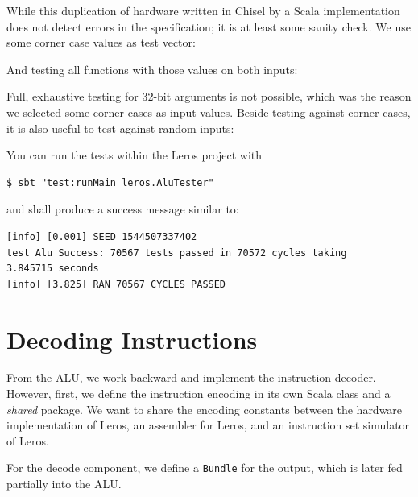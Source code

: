 \documentclass[%
    10pt,
    headinclude, footexclude,
    openright, %
    notitlepage,
    cleardoubleempty,
    headsepline,
    pointlessnumbers,
    bibtotoc, idxtotoc,
    ]{scrbook}
\newcommand{\code}[1]{{\small{\texttt{#1}}}}
\newcommand{\todo}[1]{{\emph{TODO: #1}}}
\renewcommand{\todo}[1]{}
\begin{document}

\noindent While this duplication of hardware written in Chisel by a Scala implementation does not
detect errors in the specification; it is at least some sanity check.
We use some corner case values as test vector:


\noindent And testing all functions with those values on both inputs:


\noindent Full, exhaustive testing for 32-bit arguments is not possible, which was the reason we
selected some corner cases as input values. Beside testing against corner cases, it is also useful
to test against random inputs:


\noindent You can run the tests within the Leros project with

\begin{verbatim}
$ sbt "test:runMain leros.AluTester"
\end{verbatim}

and shall produce a success message similar to:

\begin{verbatim}
[info] [0.001] SEED 1544507337402
test Alu Success: 70567 tests passed in 70572 cycles taking
3.845715 seconds
[info] [3.825] RAN 70567 CYCLES PASSED
\end{verbatim}

\section{Decoding Instructions}

From the ALU, we work backward and implement the instruction decoder.
However, first, we define the instruction encoding in its own Scala class and
a \emph{shared} package. We want to share the encoding constants between
the hardware implementation of Leros, an assembler for Leros, and an instruction
set simulator of Leros.


\todo{Update code when Leros is more complete, as stuff is missing.}

\noindent For the decode component, we define a \code{Bundle} for the output,
which is later fed partially into the ALU.
\end{document}
